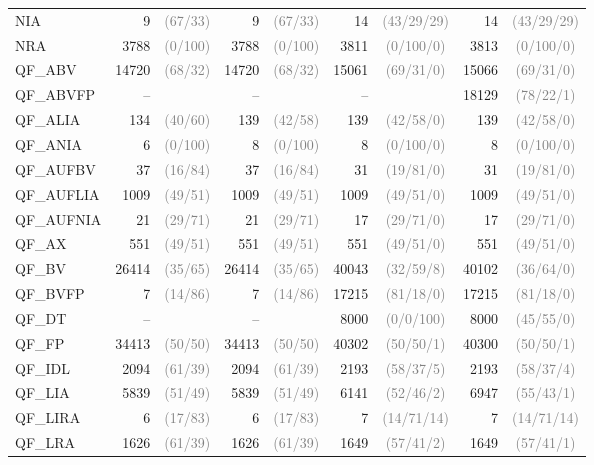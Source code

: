 \documentclass[dvipsnames,table,twoside,11pt]{article}
\newcommand{\gray}[1]{\textcolor{gray}{#1}}
\begin{document}
\begin{table}
{\begin{tabular}{lr@{\hskip3pt}cr@{\hskip3pt}cr@{\hskip3pt}cr@{\hskip3pt}c}
    NIA & 9 & \gray{(67/33)} & 9 & \gray{(67/33)} & 14 & \gray{(43/29/29)} & 14 & \gray{(43/29/29)}\\
    NRA & 3788 & \gray{(0/100)} & 3788 & \gray{(0/100)} & 3811 & \gray{(0/100/0)} & 3813 & \gray{(0/100/0)}\\
    QF\_ABV & 14720 & \gray{(68/32)} & 14720 & \gray{(68/32)} & 15061 & \gray{(69/31/0)} & 15066 & \gray{(69/31/0)}\\
    QF\_ABVFP & -- & & -- & & -- & & 18129 & \gray{(78/22/1)}\\
    QF\_ALIA & 134 & \gray{(40/60)} & 139 & \gray{(42/58)} & 139 & \gray{(42/58/0)} & 139 & \gray{(42/58/0)}\\
    QF\_ANIA & 6 & \gray{(0/100)} & 8 & \gray{(0/100)} & 8 & \gray{(0/100/0)} & 8 & \gray{(0/100/0)}\\
    QF\_AUFBV & 37 & \gray{(16/84)} & 37 & \gray{(16/84)} & 31 & \gray{(19/81/0)} & 31 & \gray{(19/81/0)}\\
    QF\_AUFLIA & 1009 & \gray{(49/51)} & 1009 & \gray{(49/51)} & 1009 & \gray{(49/51/0)} & 1009 & \gray{(49/51/0)}\\
    QF\_AUFNIA & 21 & \gray{(29/71)} & 21 & \gray{(29/71)} & 17 & \gray{(29/71/0)} & 17 & \gray{(29/71/0)}\\
    QF\_AX & 551 & \gray{(49/51)} & 551 & \gray{(49/51)} & 551 & \gray{(49/51/0)} & 551 & \gray{(49/51/0)}\\
    QF\_BV & 26414 & \gray{(35/65)} & 26414 & \gray{(35/65)} & 40043 & \gray{(32/59/8)} & 40102 & \gray{(36/64/0)}\\
    QF\_BVFP & 7 & \gray{(14/86)} & 7 & \gray{(14/86)} & 17215 & \gray{(81/18/0)} & 17215 & \gray{(81/18/0)}\\
    QF\_DT & -- & & -- & & 8000 & \gray{(0/0/100)} & 8000 & \gray{(45/55/0)}\\
    QF\_FP & 34413 & \gray{(50/50)} & 34413 & \gray{(50/50)} & 40302 & \gray{(50/50/1)} & 40300 & \gray{(50/50/1)}\\
    QF\_IDL & 2094 & \gray{(61/39)} & 2094 & \gray{(61/39)} & 2193 & \gray{(58/37/5)} & 2193 & \gray{(58/37/4)}\\
    QF\_LIA & 5839 & \gray{(51/49)} & 5839 & \gray{(51/49)} & 6141 & \gray{(52/46/2)} & 6947 & \gray{(55/43/1)}\\
    QF\_LIRA & 6 & \gray{(17/83)} & 6 & \gray{(17/83)} & 7 & \gray{(14/71/14)} & 7 & \gray{(14/71/14)}\\
    QF\_LRA & 1626 & \gray{(61/39)} & 1626 & \gray{(61/39)} & 1649 & \gray{(57/41/2)} & 1649 & \gray{(57/41/1)}\\

\end{tabular}}
\end{table}
\end{document}
